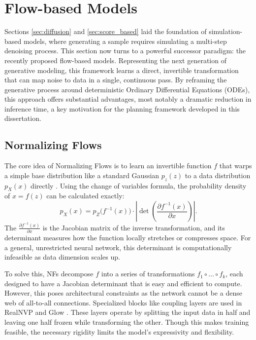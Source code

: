 \section{Flow-based Models}
\label{sec:flow_based}
Sections \ref{sec:diffusion} and \ref{sec:score_based} laid the foundation of simulation-based models, where generating a sample requires simulating a multi-step denoising process. This section now turns to a powerful successor paradigm: the recently proposed flow-based models. Representing the next generation of generative modeling, this framework learns a direct, invertible transformation that can map noise to data in a single, continuous pass. By reframing the generative process around deterministic Ordinary Differential Equations (ODEs), this approach offers substantial advantages, most notably a dramatic reduction in inference time, a key motivation for the planning framework developed in this dissertation.

\subsection{Normalizing Flows}
The core idea of Normalizing Flows is to learn an invertible function $f$ that warps a simple base distribution like a standard Gaussian $p_z(z)$ to a data distribution $p_X(x)$ directly \cite{papamakariosNormalizingFlowsProbabilistic}. Using the change of variables formula, the probability density of $x=f(z)$ can be calculated exactly:
\begin{equation}
\label{eq:nf}
	p_X(x) = p_Z\!\big(f^{-1}(x)\big) \cdot \left| \det \left( \frac{\partial f^{-1}(x)}{\partial x} \right) \right|.
\end{equation}
The $\frac{\partial f^{-1}(x)}{\partial x}$  is the Jacobian matrix of the inverse transformation, and its determinant measures how the function locally stretches or compresses space. For a general, unrestricted neural network, this determinant is computationally infeasible as data dimension scales up.

To solve this, NFs decompose $f$  into a series of transformations $f_1\circ \dots \circ f_k$, each designed to have a Jacobian determinant that is easy and efficient to compute. However, this poses architectural constraints as the network cannot be a dense web of all-to-all connections. Specialized blocks like coupling layers are used in RealNVP\cite{dinhDensityEstimationUsing2017} and Glow \cite{kingmaGlowGenerativeFlow2018}. These layers operate by splitting the input data in half and leaving one half frozen while transforming the other. Though this makes training feasible, the necessary rigidity limits the model’s expressivity and flexibility.

